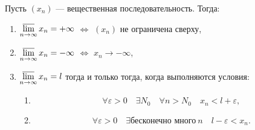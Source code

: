 \begin{theorem}
	Пусть \((x_n)\) --- вещественная последовательность. Тогда:
	\begin{enumerate}
		\item \(\varlimsup\limits_{n \to \infty} x_n = +\infty\) \(\Leftrightarrow\) \((x_n)\) не ограничена сверху,
		\item \(\varlimsup\limits_{n \to \infty} x_n = -\infty\) \(\Leftrightarrow\) \(x_n \to -\infty\),
		\item \(\varlimsup\limits_{n \to \infty} x_n = l\) тогда и только тогда, когда выполняются условия:
		\begin{enumerate}
			\item \[
				\forall \varepsilon > 0 \quad \exists N_0 \quad \forall n > N_0 \quad x_n < l + \varepsilon,
			\]
			\item \[
				\forall \varepsilon > 0 \quad \exists \textit{бесконечно много} \ n \quad l - \varepsilon < x_n.
			\]
		\end{enumerate}
	\end{enumerate}
\end{theorem}

